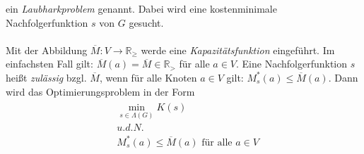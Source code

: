 \documentclass[fontsize=12pt,doubleside,openany,listof=totoc,listof=flat,listof=nochaptergap,numbers=noenddot]{article}
\begin{document}
\noindent ein \textit{Laubharkproblem} genannt. Dabei wird eine kostenminimale Nachfolgerfunktion $s$ von $G$ gesucht.\\
\\
Mit der Abbildung $\overline{M}:V \to \mathbb{R}_\geq$ werde eine \textit{Kapazitätsfunktion} eingeführt. Im einfachsten Fall gilt: $\overline{M}(a)=\overline{M} \in \mathbb{R}_>$ für alle $a \in V$. Eine Nachfolgerfunktion $s$ heißt \textit{zulässig} bzgl. $\overline{M}$, wenn für alle Knoten $a \in V$ gilt: $M^*_s(a) \leq \overline{M}(a)$. Dann wird das Optimierungsproblem in der Form 
\begin{align*}
\begin{split}
&\min\limits_{s \in \Lambda(G)} K(s)\\ &u.d.N. \\ &M^*_s(a) \leq \overline{M}(a) \text{ für alle } a \in V
\label{definition_kapazitiertes_Laubharkproblem}
\end{split}
\end{align*} 
\end{document}
